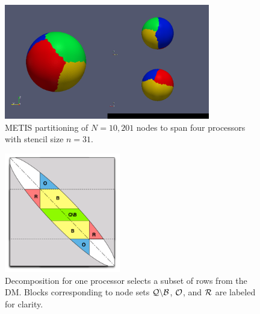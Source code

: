 \documentclass{report}
\begin{document}


\begin{figure}[ht!]
\begin{center}
\includegraphics[width=0.8\textwidth]{rbffd_methods_content/decompositions/gpmetis_decomp_sphere_4parts.png}
\caption{METIS partitioning of $N=10,201$ nodes to span four processors with stencil size $n=31$.  }
\label{fig:decomposed_sphere}
\end{center}
\end{figure}

\begin{figure}[ht!]
\begin{center}
\includegraphics[width=0.45\textwidth]{rbffd_methods_content/decompositions/MatrixDecompositionSets_RBF-FD_Bowed.pdf} 
\caption{Decomposition for one processor selects a subset of rows from the DM. Blocks corresponding to node sets $\mathcal{Q} \backslash \mathcal{B}$, $\mathcal{O}$, and $\mathcal{R}$ are labeled for clarity. }
\label{fig:decomp_matrix_view}
\end{center}
\end{figure}
\end{document}
